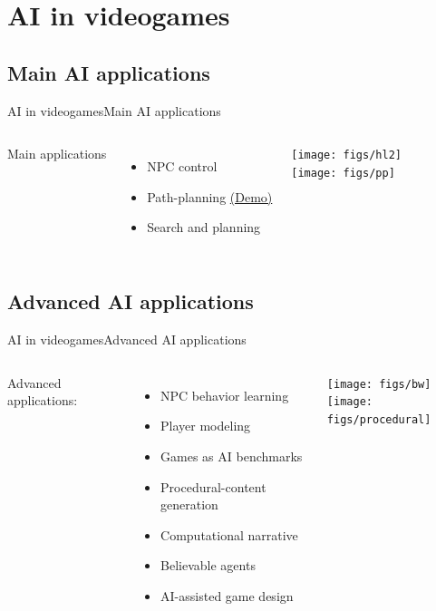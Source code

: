\documentclass[10pt,compress]{beamer} %
\begin{document}
\section{AI in videogames}
\subsection{Main AI applications}
\begin{frame}{AI in videogames}{Main AI applications}
    \begin{columns}
	\vspace{-0.5cm}
	   Main applications
	   \begin{itemize}
			\item NPC control
			\item Path-planning \href{http://qiao.github.io/PathFinding.js/visual/}{(Demo)}
			\item Search and planning
		\end{itemize}

	\texttt{[image: figs/hl2]}\\
	\texttt{[image: figs/pp]}\\
	\end{columns}
\end{frame}

\subsection{Advanced AI applications}
\begin{frame}{AI in videogames}{Advanced AI applications}
    \begin{columns}
	\vspace{-0.5cm}
	   Advanced applications:
	   \begin{itemize}
			\item NPC behavior learning
			\item Player modeling
			\item Games as AI benchmarks
			\item Procedural-content generation
			\item Computational narrative
			\item Believable agents
			\item AI-assisted game design
		\end{itemize}

	\texttt{[image: figs/bw]}\\
	\texttt{[image: figs/procedural]}
	\end{columns}
\end{frame}
\end{document}
